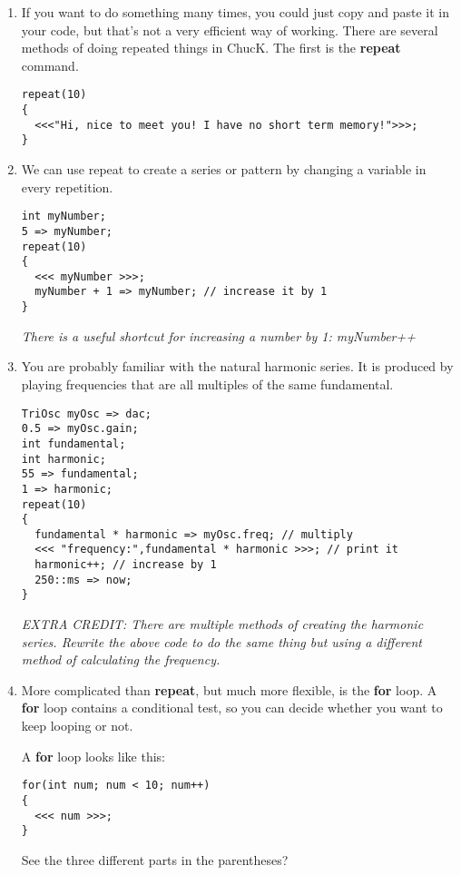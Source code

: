 \documentclass{article}
\begin{document}
\begin{enumerate}
\item If you want to do something many times, you could just copy and paste
it in your code, but that's not a very efficient way of working. There are
several methods of doing repeated things in ChucK. The first is the
\textbf{repeat} command.

\begin{lstlisting}
repeat(10)
{
  <<<"Hi, nice to meet you! I have no short term memory!">>>;
}
\end{lstlisting}

\item We can use repeat to create a series or pattern by changing a variable
in every repetition.

\begin{lstlisting}
int myNumber;
5 => myNumber;
repeat(10)
{
  <<< myNumber >>>;
  myNumber + 1 => myNumber; // increase it by 1
}
\end{lstlisting}

\textsl{There is a useful shortcut for increasing a number by 1: myNumber++}

\item You are probably familiar with the natural harmonic series. It is 
produced by playing frequencies that are all multiples of the same fundamental.

\begin{lstlisting}
TriOsc myOsc => dac;
0.5 => myOsc.gain;
int fundamental;
int harmonic;
55 => fundamental;
1 => harmonic;
repeat(10)
{
  fundamental * harmonic => myOsc.freq; // multiply
  <<< "frequency:",fundamental * harmonic >>>; // print it
  harmonic++; // increase by 1
  250::ms => now;
}
\end{lstlisting}

\textsl{EXTRA CREDIT: There are multiple methods of creating the
harmonic series. Rewrite the above code to do the same thing but using
a different method of calculating the frequency.}

\item More complicated than \textbf{repeat}, but much more flexible, is
the \textbf{for} loop. A \textbf{for} loop contains a conditional test,
so you can decide whether you want to keep looping or not.

A \textbf{for} loop looks like this:

\begin{lstlisting}
for(int num; num < 10; num++)
{
  <<< num >>>;
}
\end{lstlisting}
\pagebreak
See the three different parts in the parentheses?


\end{enumerate}
\end{document}
